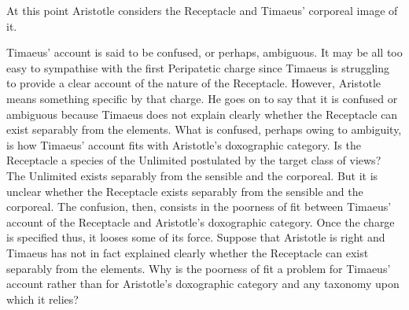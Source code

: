 At this point Aristotle considers the Receptacle and Timaeus' corporeal image of it.

Timaeus' account is said to be confused, or perhaps, ambiguous. It may be all too easy to sympathise with the first Peripatetic charge since Timaeus is struggling to provide a clear account of the nature of the Receptacle. However, Aristotle means something specific by that charge. He goes on to say that it is confused or ambiguous because Timaeus does not explain clearly whether the Receptacle can exist separably from the elements. What is confused, perhaps owing to ambiguity, is how Timaeus' account fits with Aristotle's doxographic category. Is the Receptacle a species of the Unlimited postulated by the target class of views? The Unlimited exists separably from the sensible and the corporeal. But it is unclear whether the Receptacle exists separably from the sensible and the corporeal. The confusion, then, consists in the poorness of fit between Timaeus' account of the Receptacle and Aristotle's doxographic category. Once the charge is specified thus, it looses some of its force. Suppose that Aristotle is right and Timaeus has not in fact explained clearly whether the Receptacle can exist separably from the elements. Why is the poorness of fit a problem for Timaeus' account rather than for Aristotle's doxographic category and any taxonomy upon which it relies?

